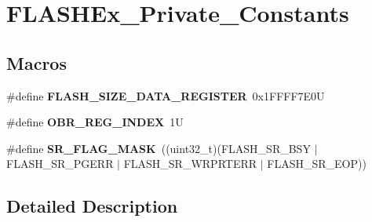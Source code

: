 \hypertarget{group___f_l_a_s_h_ex___private___constants}{}\section{F\+L\+A\+S\+H\+Ex\+\_\+\+Private\+\_\+\+Constants}
\label{group___f_l_a_s_h_ex___private___constants}
\subsection*{Macros}
\begin{DoxyCompactItemize}
\item 
\mbox{\label{group___f_l_a_s_h_ex___private___constants_ga2329f89a17061e62bf5d160cc0962e5c}} 
\#define {\bfseries F\+L\+A\+S\+H\+\_\+\+S\+I\+Z\+E\+\_\+\+D\+A\+T\+A\+\_\+\+R\+E\+G\+I\+S\+T\+ER}~0x1\+F\+F\+F\+F7\+E0U
\item 
\mbox{\label{group___f_l_a_s_h_ex___private___constants_ga8683863609a82753ffb7499d219a1de8}} 
\#define {\bfseries O\+B\+R\+\_\+\+R\+E\+G\+\_\+\+I\+N\+D\+EX}~1U
\item 
\mbox{\label{group___f_l_a_s_h_ex___private___constants_gae39dae7013f649bda7af96a79663b3f1}} 
\#define {\bfseries S\+R\+\_\+\+F\+L\+A\+G\+\_\+\+M\+A\+SK}~((uint32\+\_\+t)(F\+L\+A\+S\+H\+\_\+\+S\+R\+\_\+\+B\+SY $\vert$ F\+L\+A\+S\+H\+\_\+\+S\+R\+\_\+\+P\+G\+E\+RR $\vert$ F\+L\+A\+S\+H\+\_\+\+S\+R\+\_\+\+W\+R\+P\+R\+T\+E\+RR $\vert$ F\+L\+A\+S\+H\+\_\+\+S\+R\+\_\+\+E\+OP))
\end{DoxyCompactItemize}


\subsection{Detailed Description}
